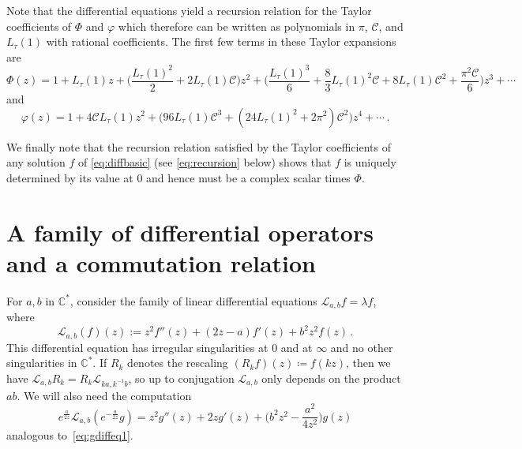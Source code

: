 \documentclass[12pt]{amsart}
\theoremstyle{plain}
\numberwithin{equation}{section}
\theoremstyle{definition}
\newcommand{\C}{\mathbb{C}}
\renewcommand{\phi}{\varphi}
\newcommand{\Cone}{\mathscr{C}}
\begin{document}
Note that the differential equations yield a recursion relation for the Taylor coefficients of $\Phi$ and $\phi$ which therefore can be written as polynomials  in $\pi$, $\Cone$, and $L_{\tau}(1)$ with rational coefficients. The first few terms in these Taylor expansions are
	\[	
	\Phi(z) = 1+L_{\tau}(1)z + \Big(\frac{L_{\tau}(1)^2}{2}+2L_{\tau}(1)\Cone\Big)z^2
	+\Big(\frac{L_{\tau}(1)^3}{6}+\frac{8}{3}L_{\tau}(1)^2\Cone+8L_{\tau}(1)\Cone^2+\frac{\pi^2\Cone}{6}\Big)z^3 + \cdots\]
and
	\begin{equation} \label{eq:phialg} \phi(z) = 1 + 4\Cone L_{\tau}(1)z^2 + \big(96L_{\tau}(1)\Cone^3+(24L_{\tau}(1)^2+2\pi^2)\Cone^2\big)z^4+\cdots\,.\end{equation}

We finally note that the recursion relation satisfied by the Taylor coefficients of any solution $f$ of \eqref{eq:diffbasic} (see \eqref{eq:recursion} below) shows that $f$ is uniquely determined by its value at $0$ and hence must be a complex scalar times $\Phi$. 

\section{A family of differential operators and a commutation relation}
\label{sec:family}
For $a,b$ in $\C^{*}$, consider the family of linear differential equations
$\mathcal{L}_{a,b}f=\lambda f$, where
\begin{equation} \label{eq:diffspecial}
	\mathcal{L}_{a,b}(f)(z) := z^2f''(z) + (2z-a)f'(z) + b^2z^2f(z)\,.
\end{equation}
This differential equation has irregular singularities at $0$ and at $\infty$ and no
other singularities in $\C^{*}$. If $R_k$ denotes the rescaling $(R_kf)(z)\coloneqq f(kz)$, then we have $\mathcal{L}_{a,b}R_k=R_k\mathcal{L}_{ka,k^{-1}b}$, so up to conjugation $\mathcal{L}_{a,b}$ only depends on the product $ab$. We will also need the computation
	\begin{equation} \label{eq:diffspecialalt}
	e^{\frac{a}{2z}}\mathcal{L}_{a,b}(e^{-\frac{a}{2z}}g) = z^2g''(z)+2zg'(z)+\Big(b^2z^2-\frac{a^2}{4z^2}\Big)g(z)
	\end{equation}
analogous to~\eqref{eq:gdiffeq1}.
\end{document}
